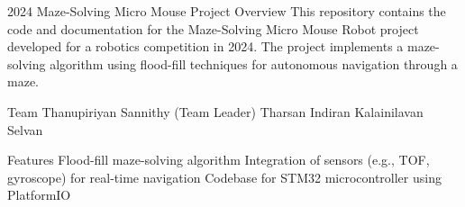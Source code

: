 2024 Maze-Solving Micro Mouse Project
Overview
This repository contains the code and documentation for the Maze-Solving Micro Mouse Robot project developed for a robotics competition in 2024. The project implements a maze-solving algorithm using flood-fill techniques for autonomous navigation through a maze.

Team
Thanupiriyan Sannithy (Team Leader)
Tharsan Indiran
Kalainilavan Selvan

Features
Flood-fill maze-solving algorithm
Integration of sensors (e.g., TOF, gyroscope) for real-time navigation
Codebase for STM32 microcontroller using PlatformIO
